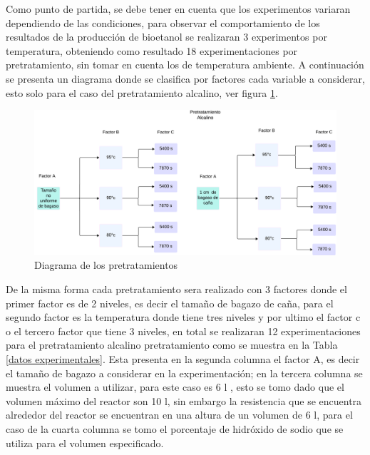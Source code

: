 \documentclass[12pt]{article}
\begin{document}
Como punto de partida, se debe tener en cuenta que los experimentos variaran dependiendo de las condiciones, para observar el comportamiento de los resultados de la producción de bioetanol se realizaran 3 experimentos por temperatura, obteniendo como resultado 18 experimentaciones por pretratamiento, sin tomar en cuenta los de temperatura ambiente.
A continuación se presenta un diagrama donde se clasifica por factores cada variable a considerar, esto solo para el caso del pretratamiento alcalino, ver figura  \ref{Diagrama1}.



\begin{figure} [h!]
	\centering
	\includegraphics[width=0.9\linewidth]{imagenes/Diagrama alcalino}
	\caption{Diagrama de los pretratamientos}
	\label{Diagrama1}
\end{figure}





De la misma forma cada pretratamiento sera realizado con 3 factores donde el primer factor es de 2 niveles, es decir el tamaño de bagazo de caña, para el segundo factor es la temperatura donde tiene tres niveles y por ultimo el factor c o el tercero factor que tiene 3 niveles, en total se realizaran 12 experimentaciones para el pretratamiento alcalino  pretratamiento como se muestra en la Tabla \ref{datos experimentales}. Esta presenta en la segunda columna el factor A, es decir el tamaño de bagazo a considerar en la experimentación; en la tercera columna se muestra el volumen a utilizar, para este caso es 6 l , esto se tomo dado que el volumen máximo del reactor son 10 l, sin embargo  la resistencia que se encuentra alrededor del reactor se encuentran en una altura de un volumen de 6 l, para el caso de la cuarta columna se tomo el porcentaje de hidróxido de sodio que se utiliza para el volumen especificado.
\end{document}

